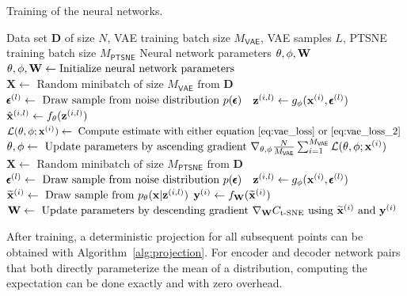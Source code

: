 \begin{algorithm}[H]
  \caption{Training of the neural networks.}
  \label{alg:learning}
  \begin{algorithmic}[1]
    \Require Data set $\mathbf{D}$ of size $N$, VAE training batch size $M_{\mathsf{VAE}}$, VAE samples $L$, PTSNE training batch size $M_{\mathsf{PTSNE}}$
    \Ensure Neural network parameters $\theta, \phi, \mathbf{W}$
    \State $\theta, \phi, \mathbf{W} \gets \text{Initialize neural network parameters}$
      \State $\mathbf{X} \gets \text{ Random minibatch of size } M_{\mathsf{VAE}} \text{ from } \mathbf{D}$
          \State $\pmb{\epsilon}^{(l)} \gets \text{ Draw sample from noise distribution } p(\pmb{\epsilon})$
          \State $\mathbf{z}^{(i,l)} \gets g_{\phi}(\mathbf{x}^{(i)}, \pmb{\epsilon}^{(l)})$ 
          \State $\hat{\mathbf{x}}^{(i,l)} \gets f_{\theta}(\mathbf{z}^{(i,l)})$ 
        \EndFor
        \State $\mathcal{L}(\theta, \phi; \mathbf{x}^{(i)}) \gets \text{ Compute estimate with either equation \ref{eq:vae_loss} or \ref{eq:vae_loss_2} }$
      \EndFor
      \State $\theta, \phi \gets \text{ Update parameters by ascending gradient } \nabla_{\theta, \phi} \frac{N}{M_{\mathsf{VAE}}} \sum_{i=1}^{M_{\mathsf{VAE}}} \mathcal{L}(\theta, \phi; \mathbf{x}^{(i)})$
    \EndWhile
      \State $\mathbf{X} \gets \text{ Random minibatch of size } M_{\mathsf{PTSNE}} \text{ from } \mathbf{D}$
        \State $\pmb{\epsilon}^{(l)} \gets \text{ Draw sample from noise distribution } p(\pmb{\epsilon})$
        \State $\mathbf{z}^{(i,l)} \gets g_{\phi}(\mathbf{x}^{(i)}, \pmb{\epsilon}^{(l)})$ 
        \State $\widetilde{\mathbf{x}}^{(i)} \gets \text{ Draw sample from } p_{\theta}(\mathbf{x} \vert \mathbf{z}^{(i,l)})$ 
        \State $\mathbf{y}^{(i)} \gets f_{\mathbf{W}}(\widetilde{\mathbf{x}}^{(i)})$
      \EndFor
      \State $\mathbf{W} \gets \text{ Update parameters by descending gradient } \nabla_{\mathbf{W}} C_{\text{t-SNE}} \text{ using } \widetilde{\mathbf{x}}^{(i)} \text{ and } \mathbf{y}^{(i)}$
    \EndWhile
  \end{algorithmic}
\end{algorithm}


After training, a deterministic projection for all subsequent points can be obtained with Algorithm~\ref{alg:projection}. For encoder and decoder network pairs that both directly parameterize the mean of a distribution, computing the expectation can be done exactly and with zero overhead.

